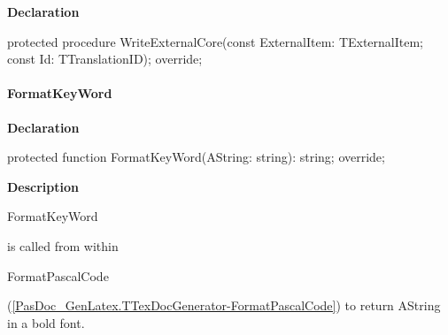 \documentclass{report}
\newif\ifpdf
\begin{document}
\label{PasDoc_GenLatex.TTexDocGenerator-WriteExternalCore}
\begin{list}{}{
\setlength{\itemindent}{0cm}
\setlength{\listparindent}{0cm}
\setlength{\leftmargin}{\evensidemargin}
\addtolength{\leftmargin}{\tmplength}
\settowidth{\labelsep}{X}
\addtolength{\leftmargin}{\labelsep}
\setlength{\labelwidth}{\tmplength}
}
\item[\textbf{Declaration}\hfill]
\ifpdf
\begin{flushleft}
\fi
\begin{ttfamily}
protected procedure WriteExternalCore(const ExternalItem: TExternalItem; const Id: TTranslationID); override;\end{ttfamily}

\ifpdf
\end{flushleft}
\fi

\end{list}
\paragraph*{FormatKeyWord}\hspace*{\fill}

\label{PasDoc_GenLatex.TTexDocGenerator-FormatKeyWord}
\begin{list}{}{
\setlength{\itemindent}{0cm}
\setlength{\listparindent}{0cm}
\setlength{\leftmargin}{\evensidemargin}
\addtolength{\leftmargin}{\tmplength}
\settowidth{\labelsep}{X}
\addtolength{\leftmargin}{\labelsep}
\setlength{\labelwidth}{\tmplength}
}
\item[\textbf{Declaration}\hfill]
\ifpdf
\begin{flushleft}
\fi
\begin{ttfamily}
protected function FormatKeyWord(AString: string): string; override;\end{ttfamily}

\ifpdf
\end{flushleft}
\fi

\par
\item[\textbf{Description}]
\begin{ttfamily}FormatKeyWord\end{ttfamily} is called from within \begin{ttfamily}FormatPascalCode\end{ttfamily}(\ref{PasDoc_GenLatex.TTexDocGenerator-FormatPascalCode}) to return AString in a bold font.

\end{list}
\end{document}
